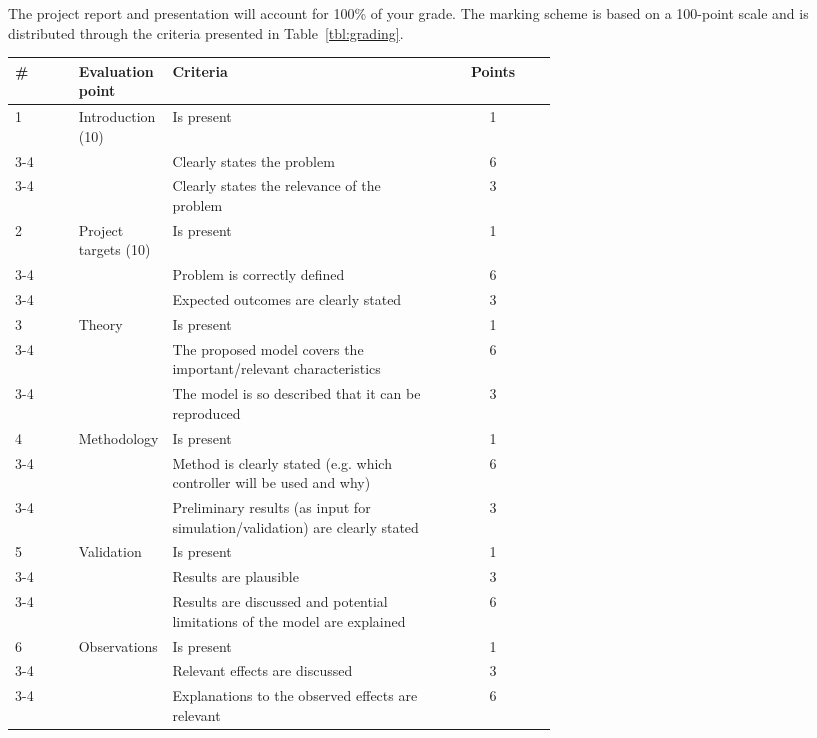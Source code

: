 	The project report and presentation will account for 100\% of your grade. The marking scheme is based on a 100-point scale and is distributed through the criteria presented in Table~\ref{tbl:grading}.
	
	\begin{table*}[h]
		\caption{Grading scheme for projects in SoSe 2020}\label{tbl:grading}
		\centering
		\begin{tabular}{l p{0.13\linewidth} p{0.5\linewidth} c}
			\hline
			\bfseries \# & \bfseries Evaluation point & \bfseries Criteria & \bfseries Points \\
			\hline
			1 & Introduction (10) & Is present & 1 \\
			\cline{3-4}
			 & & Clearly states the problem & 6 \\
			 \cline{3-4}
			 & & Clearly states the relevance of the problem & 3\\
			 \hline
			 2 & Project targets (10) & Is present & 1 \\
			 \cline{3-4}
			 & & Problem is correctly defined & 6 \\
			\cline{3-4}
			 & & Expected outcomes are clearly stated & 3 \\
			 \hline
			 3 & Theory & Is present & 1 \\
			\cline{3-4}
			 & & The proposed model covers the important/relevant characteristics & 6 \\
			\cline{3-4}
			 & & The model is so described that it can be reproduced & 3\\
			 \hline
			 4 & Methodology & Is present & 1 \\
			\cline{3-4}
			 & & Method is clearly stated (e.g. which controller will be used and why) & 6 \\
			\cline{3-4}
			 & & Preliminary results (as input for simulation/validation) are clearly stated & 3\\
			 \hline
			 5 & Validation & Is present & 1 \\
			\cline{3-4}
			  & & Results are plausible & 3\\
			\cline{3-4}
			  & & Results are discussed and potential limitations of the model are explained & 6\\
			 \hline
			 6 & Observations & Is present & 1\\
			\cline{3-4}
			& & Relevant effects are discussed & 3\\
			\cline{3-4}
			& & Explanations to the observed effects are relevant & 6\\
			\hline

\end{tabular}
\end{table*}
